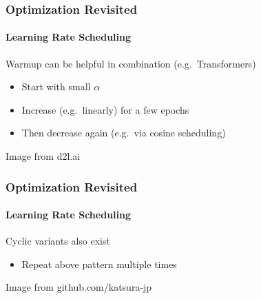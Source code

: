\documentclass[xetex,professionalfont]{beamer}
\renewcommand\emph[1]{\textcolor{tuwcvl_cvl_blue}{#1}}
\begin{document}
  \begin{frame}
    \frametitle{Optimization Revisited}
    \framesubtitle{Learning Rate Scheduling}
    
  \emph{Warmup} can be helpful in combination (e.g.~Transformers) %
  \begin{itemize}
    \item Start with small $\alpha$
    \item Increase (e.g.~linearly) for a few epochs
    \item Then decrease again (e.g.~via cosine scheduling)
  \end{itemize}

  \medskip
  
\begin{center}
  {\centering Image from d2l.ai}
\end{center}
    
\end{frame}


  \begin{frame}
    \frametitle{Optimization Revisited}
    \framesubtitle{Learning Rate Scheduling}
    
    Cyclic variants also exist
    \begin{itemize}
      \item Repeat above pattern multiple times
    \end{itemize}
    
    \begin{center}
      {\centering Image from github.com/katsura-jp}
    \end{center}

\end{frame}
\end{document}

